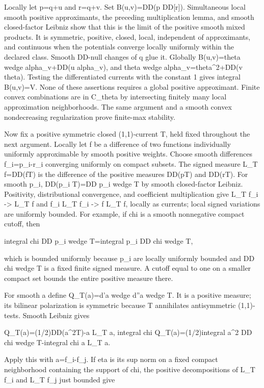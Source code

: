 \documentclass[11pt]{article}
\begin{document}
Locally let p=q+u and r=q+v. Set B(u,v)=DD(p DD[r]). Simultaneous local smooth positive approximants, the preceding multiplication lemma, and smooth closed-factor Leibniz show that this is the limit of the positive smooth mixed products. It is symmetric, positive, closed, local, independent of approximants, and continuous when the potentials converge locally uniformly within the declared class. Smooth DD-null changes of q glue it. Globally B(u,v)=theta wedge alpha\_v+DD(u alpha\_v), and theta wedge alpha\_v=theta\textasciicircum{}2+DD(v theta). Testing the differentiated currents with the constant 1 gives integral B(u,v)=V. None of these assertions requires a global positive approximant. Finite convex combinations are in C\_theta by intersecting finitely many local approximation neighborhoods. The same argument and a smooth convex nondecreasing regularization prove finite-max stability.

Now fix a positive symmetric closed (1,1)-current T, held fixed throughout the next argument. Locally let f be a difference of two functions individually uniformly approximable by smooth positive weights. Choose smooth differences f\_i=p\_i-r\_i converging uniformly on compact subsets. The signed measure L\_T f=DD(fT) is the difference of the positive measures DD(pT) and DD(rT). For smooth p\_i, DD(p\_i T)=DD p\_i wedge T by smooth closed-factor Leibniz. Positivity, distributional convergence, and coefficient multiplication give L\_T f\_i -> L\_T f and f\_i L\_T f\_i -> f L\_T f, locally as currents; local signed variations are uniformly bounded. For example, if chi is a smooth nonnegative compact cutoff, then

integral chi DD p\_i wedge T=integral p\_i DD chi wedge T,

which is bounded uniformly because p\_i are locally uniformly bounded and DD chi wedge T is a fixed finite signed measure. A cutoff equal to one on a smaller compact set bounds the entire positive measure there.

For smooth a define Q\_T(a)=d'a wedge d''a wedge T. It is a positive measure; its bilinear polarization is symmetric because T annihilates antisymmetric (1,1)-tests. Smooth Leibniz gives

Q\_T(a)=(1/2)DD(a\textasciicircum{}2T)-a L\_T a,
integral chi Q\_T(a)=(1/2)integral a\textasciicircum{}2 DD chi wedge T-integral chi a L\_T a.

Apply this with a=f\_i-f\_j. If eta is its sup norm on a fixed compact neighborhood containing the support of chi, the positive decompositions of L\_T f\_i and L\_T f\_j just bounded give
\end{document}

